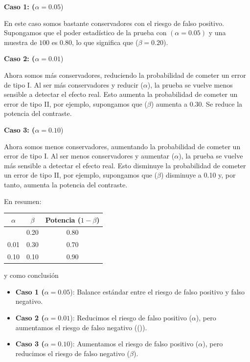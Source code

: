 \documentclass[
  letterpaper,
  DIV=11,
  numbers=noendperiod]{scrreprt}
\providecommand{\tightlist}{%
  \setlength{\itemsep}{0pt}\setlength{\parskip}{0pt}}\usepackage{longtable,booktabs,array}
\begin{document}
\begin{tcolorbox}
\textbf{Caso 1: (}\(\alpha = 0.05\))

En este caso somos bastante conservadores con el riesgo de falso
positivo. Supongamos que el poder estadístico de la prueba con
\((\alpha = 0.05)\) y una muestra de \(100\) es \(0.80\), lo que
significa que (\(\beta = 0.20\)).

\textbf{Caso 2: (}\(\alpha = 0.01\))

Ahora somos más conservadores, reduciendo la probabilidad de cometer un
error de tipo I. Al ser más conservadores y reducir (\(\alpha\)), la
prueba se vuelve menos sensible a detectar el efecto real. Esto aumenta
la probabilidad de cometer un error de tipo II, por ejemplo, supongamos
que (\(\beta\)) aumenta a \(0.30\). Se reduce la potencia del contraste.

\textbf{Caso 3: (}\(\alpha = 0.10\))

Ahora somos menos conservadores, aumentando la probabilidad de cometer
un error de tipo I. Al ser menos conservadores y aumentar (\(\alpha\)),
la prueba se vuelve más sensible a detectar el efecto real. Esto
disminuye la probabilidad de cometer un error de tipo II, por ejemplo,
supongamos que (\(\beta\)) disminuye a 0.10 y, por tanto, aumenta la
potencia del contraste.

En resumen:

\begin{longtable}[]{@{}ccc@{}}
\toprule\noalign{}
\(\alpha\) & \(\beta\) & Potencia (\(1-\beta\)) \\
\midrule\noalign{}
\endhead
\bottomrule\noalign{}
\endlastfoot
0.05 & 0.20 & 0.80 \\
0.01 & 0.30 & 0.70 \\
0.10 & 0.10 & 0.90 \\
\end{longtable}

y como conclusión

\begin{itemize}
\tightlist
\item
  \textbf{Caso 1 (}\(\alpha = 0.05\)): Balance estándar entre el riesgo
  de falso positivo y falso negativo.
\item
  \textbf{Caso 2 (}\(\alpha = 0.01\)): Reducimos el riesgo de falso
  positivo (\(\alpha\)), pero aumentamos el riesgo de falso negativo
  ((\beta)).
\item
  \textbf{Caso 3 (}\(\alpha = 0.10\)): Aumentamos el riesgo de falso
  positivo (\(\alpha\)), pero reducimos el riesgo de falso negativo
  (\(\beta\)).
\end{itemize}

\end{tcolorbox}
\end{document}
